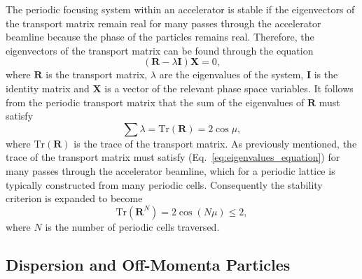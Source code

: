 \documentclass[../main.tex]{subfiles}
\begin{document}
The periodic focusing system within an accelerator is stable if the eigenvectors of the transport matrix remain real for many passes through the accelerator beamline because the phase of the particles remains real. Therefore, the eigenvectors of the transport matrix can be found through the equation
\begin{equation}
\left(\boldsymbol{R}-\lambda\boldsymbol{I}\right)\boldsymbol{X} = 0,
\label{eq:eigenvalues_equation}    
\end{equation}
where $\boldsymbol{R}$ is the transport matrix, $\lambda$ are the eigenvalues of the system, $\boldsymbol{I}$ is the identity matrix and $\boldsymbol{X}$ is a vector of the relevant phase space variables. It follows from the periodic transport matrix that the sum of the eigenvalues of $\boldsymbol{R}$ must satisfy
\begin{equation}
\sum\lambda = \boldsymbol{\mathrm{Tr}}\left(\boldsymbol{R}\right) = 2\cos\mu,
\label{eq:eigenvalue_stability}
\end{equation}
where $\boldsymbol{\mathrm{Tr}}\left(\boldsymbol{R}\right)$ is the trace of the transport matrix. As previously mentioned, the trace of the transport matrix must satisfy (Eq.~\ref{eq:eigenvalues_equation}) for many passes through the accelerator beamline, which for a periodic lattice is typically constructed from many periodic cells. Consequently the stability criterion is expanded to become
\begin{equation}
\boldsymbol{\mathrm{Tr}}\left(\boldsymbol{R}^{N}\right) = 2\cos\left(N\mu\right) \leq 2, 
\label{eq:stability_criterion}    
\end{equation}
where $N$ is the number of periodic cells traversed.

\subsection{Dispersion and Off-Momenta Particles} 
\label{sec:dispersion_off_momentum_particles}
\end{document}
